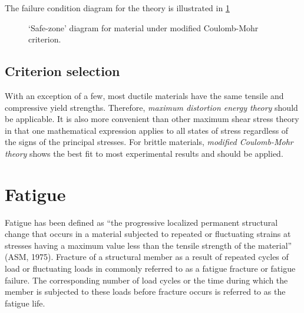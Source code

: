 \documentclass[
10pt,
a4paper,
openany,
svgnames,
]{book}
\begin{document}
The failure condition diagram for the theory is illustrated in \cref{fig: MCM safe zone}

\begin{figure}[h]
  \centering
  \caption{`Safe-zone' diagram for material under modified Coulomb-Mohr criterion.}
  \label{fig: MCM safe zone}
\end{figure}

\subsection{Criterion selection}

With an exception of a few, most ductile materials have the same tensile and compressive yield strengths. Therefore, \emph{maximum distortion energy theory} should be applicable. It is also more convenient than other maximum shear stress theory in that one mathematical expression applies to all states of stress regardless of the signs of the principal stresses.
For brittle materials, \emph{modified Coulomb-Mohr theory} shows the best fit to most experimental results and should be applied.

\section{Fatigue} \label{sec: fatigue}

Fatigue has been defined as “the progressive localized permanent structural change that occurs in a material subjected to repeated or fluctuating strains at stresses having a maximum value less than the tensile strength of the material” (ASM, 1975). Fracture of a structural member as a result of repeated cycles of load or fluctuating loads in commonly referred to as a fatigue fracture or fatigue failure. The corresponding number of load cycles or the time during which the member is subjected to these loads before fracture occurs is referred to as the fatigue life.
\end{document}
